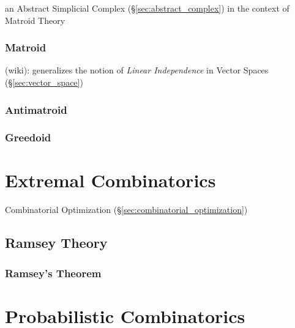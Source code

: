 an Abstract Simplicial Complex (\S\ref{sec:abstract_complex}) in the context of
Matroid Theory



\subsubsection{Matroid}\label{sec:matroid}

(wiki): generalizes the notion of \emph{Linear Independence} in Vector Spaces
(\S\ref{sec:vector_space})



\subsubsection{Antimatroid}\label{sec:antimatroid}

\subsubsection{Greedoid}\label{sec:greedoid}



\section{Extremal Combinatorics}\label{sec:extremal_combinatorics}

Combinatorial Optimization (\S\ref{sec:combinatorial_optimization})



\subsection{Ramsey Theory}\label{sec:ramsey_theory}

\subsubsection{Ramsey's Theorem}\label{sec:ramseys_theorem}



\section{Probabilistic Combinatorics}\label{sec:probabilistic_combinatorics}

